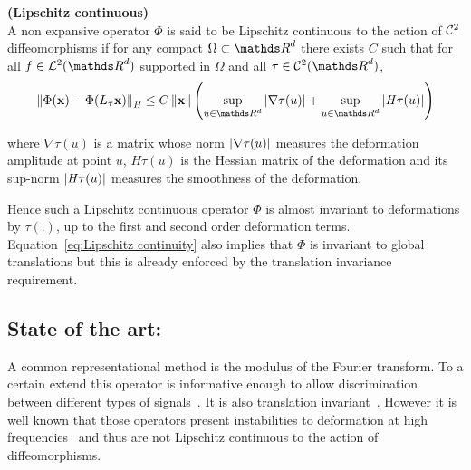 \documentclass[a4paper,11pt]{report}
\begin{document}
			\begin{defn} \textbf{(Lipschitz continuous)}\\
				A non expansive operator $\Phi$ is said to be Lipschitz continuous to the action of $\mathcal{C}^{2}$ diffeomorphisms if for any compact $\Omega \subset \dsR^{d}$ there exists $C$ such that for all $f \in \mcalL^{2}(\dsR^{d})$ supported in $\Omega$ and all $\tau \in \mcalC^{2}(\dsR^{d})$,
				\begin{equation}
					\norm{\Phi(\bfx) - \Phi(L_{\tau}\bfx)}_{\mathit{H}} \leq 
					C \norm{\bfx} \left(\sup_{u \in \dsR^{d}} \abs{\nabla \tau(u)} + \sup_{u \in \dsR^{d}} \abs{\mathit{H}\tau(u)}\right)
					\label{eq:Lipschitz continuity}
				\end{equation}
				\label{pty:Lipschitz continuity - intuition}
							
				where $\nabla \tau(u)$ is a matrix whose norm $\left| \nabla \tau(u) \right|$ measures the deformation amplitude at point $u$, $\mathit{H}\tau(u)$ is the Hessian matrix of the deformation and its sup-norm $\left| \mathit{H}\tau(u) \right|$ measures the smoothness of the deformation.\\
      \end{defn}

      Hence such a Lipschitz continuous operator $\Phi$ is almost invariant to deformations by $\tau(.)$, up to the first and second order deformation terms. Equation~\ref{eq:Lipschitz continuity} also implies that $\Phi$ is invariant to global translations but this is already enforced by the translation invariance requirement.\\ 
      

    \subsection{State of the art:}
      \label{sec:Intro/Signal rep/State of the art}      
          
			A common representational method is the modulus of the Fourier transform. To a certain extend this operator is informative enough to allow discrimination between different types of signals~\citep{baker2014using}. It is also translation invariant~\citep{bracewell1965fourier}. However it is well known that those operators present instabilities to deformation at high frequencies~\citep{hormander1971fourier} and thus are not Lipschitz continuous to the action of diffeomorphisms.\\
      
\end{document}
